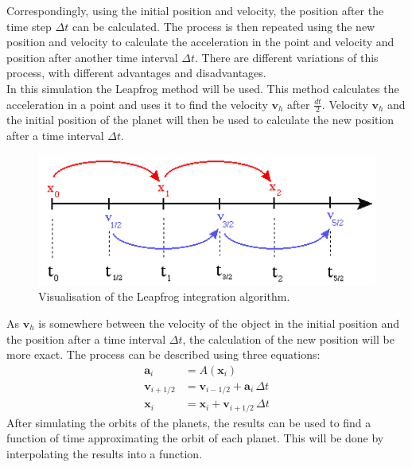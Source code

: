 \documentclass[reprint,english,notitlepage]{revtex4-2}
\begin{document}
Correspondingly, using the initial position and velocity, the position after the time step $\Delta t$ can be calculated.
The process is then repeated using the new position and velocity to calculate the acceleration in the point and velocity and position after another time interval $\Delta t$.
There are different variations of this process, with different advantages and disadvantages.\\
In this simulation the Leapfrog method will be used.
This method calculates the acceleration in a point and uses it to find the velocity $\textbf{v}_h$ after $ \frac{dt}{2}$.
Velocity $\textbf{v}_h$ and the initial position of the planet will then be used to calculate the new position after a time interval $\Delta t$.\newline
\begin{figure}[h]
	\centering
	\includegraphics[scale=0.4]{Figures/leapfrog1}
	\caption{Visualisation of the Leapfrog integration algorithm.%
	}\label{fig:Leapfrog_vis}
\end{figure}\newline
As $\textbf{v}_h$ is somewhere between the velocity of the object in the initial position and the position after a time interval $\Delta t$, the calculation of the new position will be more exact.
The process can be described using three equations:
\begin{align*}
    \textbf{a}_i &= A(\textbf{x}_i)\\
	\textbf{v}_{i+1/2} &= \textbf{v}_{i-1/2} + \textbf{a}_i\,\Delta t\\
	\textbf{x}_{i} &= \textbf{x}_i + \textbf{v}_{i+1/2}\,\Delta t
\end{align*}
After simulating the orbits of the planets, the results can be used to find a function of time approximating the orbit of each planet.
This will be done by interpolating the results into a function.\newline \newline
\end{document}
